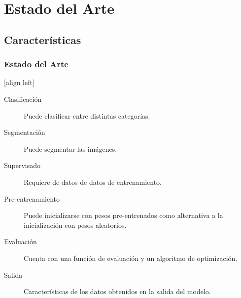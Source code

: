 \documentclass{beamer}
\begin{document}
\section{Estado del Arte}

\subsection{Características}
\begin{frame}
    \frametitle{Estado del Arte}
    [align left]
    \begin{description}
        \item[Clasificación]{Puede clasificar entre distintas categorías.}
        \item[Segmentación]{Puede segmentar las imágenes.}
        \item[Supervisado]{Requiere de datos de datos de entrenamiento.}
        \item[Pre-entrenamiento]{Puede inicializarse con pesos pre-entrenados como alternativa a la inicialización con pesos aleatorios.}
        \item[Evaluación]{Cuenta con una función de evaluación y un algoritmo de optimización.}
        \item[Salida]{Características de los datos obtenidos en la salida del modelo.}
    \end{description}
\end{frame}
\end{document}
